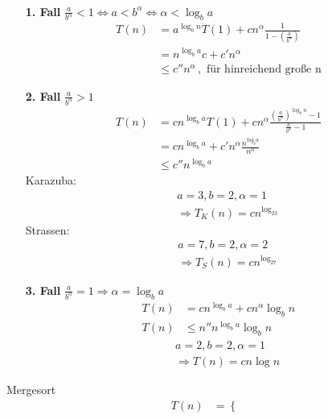 \documentclass[a4paper,twoside,10pt]{report}
\begin{document}
{\\[.5em]
\begin{itemize}
\item[\textbf{1. Fall}]$\frac{a}{b^\alpha}<1\Leftrightarrow a<b^\alpha \Leftrightarrow \alpha < \log_ba$
\begin{align*}
T(n)&=a^{\log_bn}T(1)+cn^\alpha\frac{1}{1-\left(\frac{a}{b^\alpha}\right)}\\
&= n^{\log_ba}c+c'n^\alpha\\
&\le c''n^\alpha \,,\,\, \mbox{für hinreichend große n}
\end{align*}
\item[\textbf{2. Fall}]$\frac{a}{b^\alpha}>1$
\begin{align*}
T(n)&=cn^{\log_ba}T(1)+cn^\alpha\frac{\left(\frac{a}{b^\alpha}\right)^{\log_bn}-1}{\frac{a}{b^\alpha}-1}\\
&=cn^{\log_ba}+c'n^\alpha\frac{n^{log_ba}}{n^\alpha}\\
&\le  c''n^{\log_ba}
\end{align*}
Karazuba:
\begin{align*}&&a=3,b=2,\alpha=1\\&&\Rightarrow T_K(n)=cn^{\log_23}\end{align*}
Strassen:
\begin{align*}&&a=7,b=2,\alpha=2\\&&\Rightarrow T_S(n)=cn^{\log_27}\end{align*}
\item[\textbf{3. Fall}]$\frac{a}{b^\alpha}=1 \Rightarrow \alpha = \log_ba$
\begin{align*}
T(n)&=cn^{\log_ba}+cn^\alpha\log_bn\\
T(n)&\le n''n^{\log_ba}\log_bn
\end{align*}
\begin{align*}
&&a=2,b=2,\alpha=1\\
&&\Rightarrow T(n)=cn\log n
\end{align*}
\end{itemize}
Mergesort
\begin{align*}
T(n)&=\left\{\begin{array}{ll}

\end{array}
\end{align*}}
\end{document}
